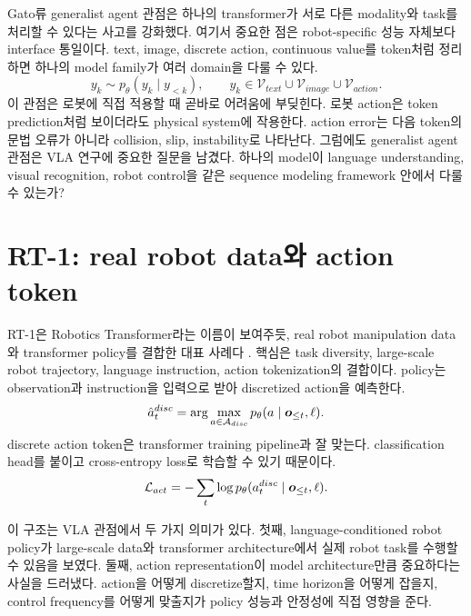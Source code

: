 Gato류 generalist agent 관점은 하나의 transformer가 서로 다른 modality와 task를 처리할 수 있다는 사고를 강화했다. 여기서 중요한 점은 robot-specific 성능 자체보다 interface 통일이다. text, image, discrete action, continuous value를 token처럼 정리하면 하나의 model family가 여러 domain을 다룰 수 있다.
\begin{equation}
  y_{k}
  \sim
  p_{\theta}(y_k \mid y_{<k}),
  \qquad
  y_k \in \mathcal{V}_{text}\cup\mathcal{V}_{image}\cup\mathcal{V}_{action}.
  \label{eq:generalist-token-model}
\end{equation}
이 관점은 로봇에 직접 적용할 때 곧바로 어려움에 부딪힌다. 로봇 action은 token prediction처럼 보이더라도 physical system에 작용한다. action error는 다음 token의 문법 오류가 아니라 collision, slip, instability로 나타난다. 그럼에도 generalist agent 관점은 VLA 연구에 중요한 질문을 남겼다. 하나의 model이 language understanding, visual recognition, robot control을 같은 sequence modeling framework 안에서 다룰 수 있는가?

\section{RT-1: real robot data와 action token}

RT-1은 Robotics Transformer라는 이름이 보여주듯, real robot manipulation data와 transformer policy를 결합한 대표 사례다 \cite{rt12022}. 핵심은 task diversity, large-scale robot trajectory, language instruction, action tokenization의 결합이다. policy는 observation과 instruction을 입력으로 받아 discretized action을 예측한다.
\begin{equation}
  \hat{a}_{t}^{disc}
  =
  \arg\max_{a\in\mathcal{A}_{disc}}
  p_{\theta}(a\mid \bm{o}_{\leq t},\ell).
  \label{eq:rt1-discrete-action}
\end{equation}
discrete action token은 transformer training pipeline과 잘 맞는다. classification head를 붙이고 cross-entropy loss로 학습할 수 있기 때문이다.
\begin{equation}
  \mathcal{L}_{act}
  =
  -
  \sum_t
  \log
  p_{\theta}(a_t^{disc}\mid \bm{o}_{\leq t},\ell).
  \label{eq:discrete-action-loss}
\end{equation}

이 구조는 VLA 관점에서 두 가지 의미가 있다. 첫째, language-conditioned robot policy가 large-scale data와 transformer architecture에서 실제 robot task를 수행할 수 있음을 보였다. 둘째, action representation이 model architecture만큼 중요하다는 사실을 드러냈다. action을 어떻게 discretize할지, time horizon을 어떻게 잡을지, control frequency를 어떻게 맞출지가 policy 성능과 안정성에 직접 영향을 준다.

